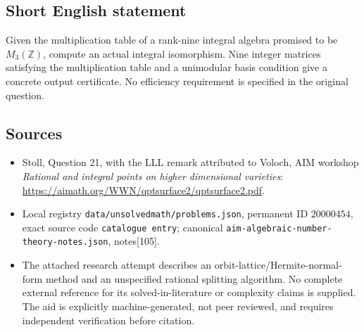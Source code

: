 \documentclass[11pt]{article}
\newcommand{\Z}{\mathbb{Z}}
\begin{document}
\subsection{Short English statement}
Given the multiplication table of a rank-nine integral algebra promised to be \(M_3(\Z)\), compute an actual integral isomorphism. Nine integer matrices satisfying the multiplication table and a unimodular basis condition give a concrete output certificate. No efficiency requirement is specified in the original question.
\subsection{Sources}
\begin{itemize}
\item Stoll, Question 21, with the LLL remark attributed to Voloch, AIM workshop \emph{Rational and integral points on higher dimensional varieties}: \url{https://aimath.org/WWN/qptsurface2/qptsurface2.pdf}.
\item Local registry \texttt{data/unsolvedmath/problems.json}, permanent ID \(20000454\), exact source code \texttt{catalogue entry}; canonical \texttt{aim-algebraic-number-theory-notes.json}, notes[105].
\item The attached research attempt describes an orbit-lattice/Hermite-normal-form method and an unspecified rational splitting algorithm. No complete external reference for its solved-in-literature or complexity claims is supplied. The aid is explicitly machine-generated, not peer reviewed, and requires independent verification before citation.
\end{itemize}
\end{document}
